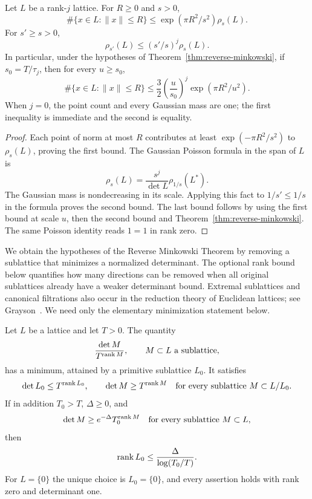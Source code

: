 \begin{lemma}\label{lem:gaussian-count}
Let \(L\) be a rank-\(j\) lattice. For \(R\ge0\) and \(s>0\),
\[
 \#\{x\in L:\|x\|\le R\}
 \le \exp(\pi R^2/s^2)\rho_s(L).
\]
For \(s'\ge s>0\),
\[
 \rho_{s'}(L)\le (s'/s)^j\rho_s(L).
\]
In particular, under the hypotheses of
Theorem~\ref{thm:reverse-minkowski}, if \(s_0=T/\tau_j\), then for
every \(u\ge s_0\),
\[
 \#\{x\in L:\|x\|\le R\}
 \le\frac32\left(\frac{u}{s_0}\right)^j
       \exp(\pi R^2/u^2).
\]
When \(j=0\), the point count and every Gaussian mass are one; the
first inequality is immediate and the second is equality.
\end{lemma}

\begin{proof}
Each point of norm at most \(R\) contributes at least
\(\exp(-\pi R^2/s^2)\) to \(\rho_s(L)\), proving the first bound.
The Gaussian Poisson formula in the span of \(L\) is
\[
 \rho_s(L)=\frac{s^j}{\det L}\rho_{1/s}(L^*).
\]
The Gaussian mass is nondecreasing in its scale. Applying this fact
to \(1/s'\le1/s\) in the formula proves the second bound. The last
bound follows by using the first bound at scale \(u\), then the
second bound and Theorem~\ref{thm:reverse-minkowski}. The same
Poisson identity reads \(1=1\) in rank zero.
\end{proof}

We obtain the hypotheses of the Reverse Minkowski Theorem by removing
a sublattice that minimizes a normalized determinant. The optional
rank bound below quantifies how many directions can be removed when
all original sublattices already have a weaker determinant bound.
Extremal sublattices and canonical filtrations also occur in the
reduction theory of Euclidean lattices; see
Grayson~\cite[Section~1]{Grayson}. We need only the elementary
minimization statement below.

\begin{lemma}\label{lem:det-minimizer}
Let \(L\) be a lattice and let \(T>0\). The quantity
\[
 \frac{\det M}{T^{\operatorname{rank} M}},\qquad M\subset L\text{ a sublattice},
\]
has a minimum, attained by a primitive sublattice \(L_0\). It
satisfies
\[
 \det L_0\le T^{\operatorname{rank} L_0},\qquad
 \det M\ge T^{\operatorname{rank} M}\quad\text{for every sublattice }M\subset L/L_0.
\]
If in addition \(T_0>T\), \(\Delta\ge0\), and
\[
 \det M\ge e^{-\Delta}T_0^{\operatorname{rank} M}
       \quad\text{for every sublattice }M\subset L,
\]
then
\[
 \operatorname{rank} L_0\le\frac{\Delta}{\log(T_0/T)}.
\]
For \(L=\{0\}\) the unique choice is \(L_0=\{0\}\), and every
assertion holds with rank zero and determinant one.
\end{lemma}

